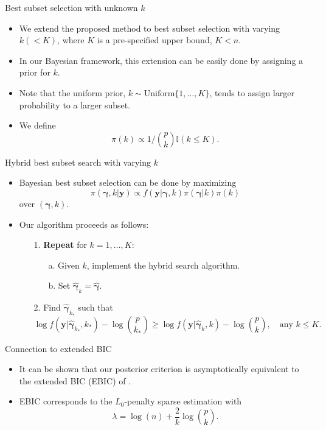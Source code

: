 \documentclass[citecolor=blue,10pt]{beamer}
\def\bg{{\boldsymbol \gamma}}
\newcommand{\0} {\mbox{\boldmath$0$}}
\newcommand{\uy}{{\boldsymbol y}}
\begin{document}
\begin{frame}{Best subset selection with unknown $k$}
\begin{itemize}\itemsep=3mm
\item We extend the proposed method to best subset selection with varying $k (<K)$, where $K$ is a pre-specified upper bound, $K<n$.
\item In our Bayesian framework, this extension can be easily done by assigning a prior for $k$.
\item Note that the uniform prior, $k \sim \text{Uniform}\{1,\ldots,K\}$, tends to assign larger probability to a larger subset. 
\item We define
$$\pi(k)\propto 1/\binom{p}{k} \mathbb{I}(k\leq K).$$
\end{itemize}
\end{frame}

\begin{frame}{Hybrid best subset search with varying $k$}
\begin{itemize}\itemsep=3mm
\item Bayesian best subset selection can be done by maximizing
$$ \pi(\bg,k|\uy) \propto f(\uy|\bg, k)\pi(\bg| k) \pi(k)$$
over $(\bg,k)$.
\item Our algorithm proceeds as follows:\\

 \begin{itemize}\itemsep=3mm
  \item[1.] \textbf{Repeat} for $k=1,\ldots,K$:
        \begin{itemize}
         \item[a.] Given $k$, implement the hybrid search algorithm.
         \item[b.] Set $\hat{\bg}_k=\hat{\bg}$.
        \end{itemize}
  \item[2.] Find $\hat{\bg}_{k_*}$ such that $$ \log f(\uy|\hat{\bg}_{k_*},{k_*})-\log \binom{p}{{k_*}} \geq \log f(\uy|\hat{\bg}_k,k)-\log \binom{p}{k},\quad \text{any $k\leq K$}.$$
 \end{itemize}

\end{itemize}
\end{frame}


\begin{frame}{Connection to extended BIC}

\begin{itemize}\itemsep=3mm
\item It can be shown that our posterior criterion is asymptotically equivalent to the extended BIC (EBIC) of \citet{chen2008extended}.
\item EBIC corresponds to the $L_0$-penalty sparse estimation with 
$$\lambda = \log (n)+ \frac{2}{k}\log \binom{p}{k}.$$
\end{itemize}
\end{frame}
\end{document}
